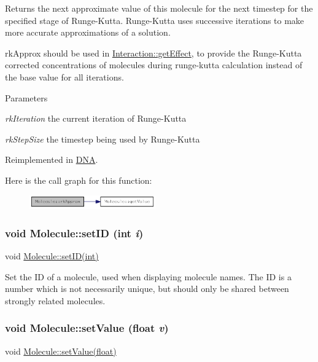Returns the next approximate value of this molecule for the next timestep for the specified stage of Runge-\/Kutta. Runge-\/Kutta uses successive iterations to make more accurate approximations of a solution.

rkApprox should be used in \hyperlink{classInteraction_a6328831e714adf9c8177f6052d2e017f}{Interaction::getEffect}, to provide the Runge-\/Kutta corrected concentrations of molecules during runge-\/kutta calculation instead of the base value for all iterations.


\begin{DoxyParams}{Parameters}
\item[{\em rkIteration}]the current iteration of Runge-\/Kutta \item[{\em rkStepSize}]the timestep being used by Runge-\/Kutta \end{DoxyParams}


Reimplemented in \hyperlink{classDNA_a10bec8cdc5922b2780887666c53891f1}{DNA}.

Here is the call graph for this function:\nopagebreak
\begin{figure}[H]
\begin{center}
\leavevmode
\includegraphics[width=154pt]{classMolecule_adabb58a65655a7f55dae0d82b65d04ba_cgraph}
\end{center}
\end{figure}
\hypertarget{classMolecule_a4f1f48fc2b13b96d7f8015394895e240}{
\subsubsection[{setID}]{\setlength{\rightskip}{0pt plus 5cm}void Molecule::setID (int {\em i})}}
\label{classMolecule_a4f1f48fc2b13b96d7f8015394895e240}
void \hyperlink{classMolecule_a4f1f48fc2b13b96d7f8015394895e240}{Molecule::setID(int)}

Set the ID of a molecule, used when displaying molecule names. The ID is a number which is not necessarily unique, but should only be shared between strongly related molecules. \hypertarget{classMolecule_a227fedba365853cee63c4e18669a56fa}{
\subsubsection[{setValue}]{\setlength{\rightskip}{0pt plus 5cm}void Molecule::setValue (float {\em v})}}
\label{classMolecule_a227fedba365853cee63c4e18669a56fa}
void \hyperlink{classMolecule_a227fedba365853cee63c4e18669a56fa}{Molecule::setValue(float)}


